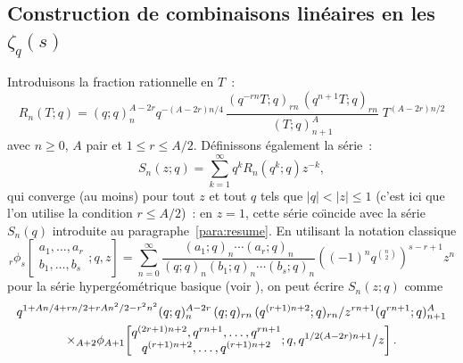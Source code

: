 \documentclass[12pt]{amsart}
\newcommand{\io}{\infty}
\def\poq#1#2{(#1;q)_#2}
\theoremstyle{remark}
\numberwithin{equation}{section}
\begin{document}
\subsection{Construction de combinaisons lin{\'e}aires 
en les $\zeta_q(s)$ }\label{ssec:combE}
Introduisons la fraction rationnelle en $T$~: 
\begin{equation*}
R_n(T;q)
= (q;q)_n^{A-2r}q^{-(A-2r)n/4}\,
\frac{(q^{-rn}T;q)_{rn}\,(q^{n+1}T;q)_{rn}}{(T;q)_{n+1}^{A}}\;T^{(A-2r)n/2}
\end{equation*}
avec $n\ge 0$, $A$ pair et $1\le r\le  A/2$.
D{\'e}finissons {\'e}galement la
s{\'e}rie~:
$$
S_n(z;q)=\sum_{k=1}^{\io}q^k R_n(q^k;q)z^{-k},
$$
qui converge (au moins) pour tout $z$ et tout $q$ tels que 
$\vert q\vert <\vert z\vert \le 1$ 
(c'est ici que l'on utilise la condition $r\le A/2$)~: 
en $z=1$, cette s{\'e}rie co{\"\i}ncide avec 
la s{\'e}rie $S_n(q)$ introduite au paragraphe~\ref{para:resume}. 
En utilisant la notation classique
\begin{equation} \label{eq:hyp}
{}_r\phi_s\!\left[\begin{matrix} a_1,\dots,a_r\\
b_1,\dots,b_s\end{matrix}; q,
z\right]=\sum _{n=0} ^{\infty}\frac {\poq{a_1}{n}\cdots\poq{a_r}{n}}
{\poq{q}{n}\poq{b_1}{n}\cdots\poq{b_s}{n}}\left((-1)^nq^{\binom
n2}\right)^{s-r+1}z^n
\end{equation}
pour la s{\'e}rie hyperg{\'e}om{\'e}trique basique (voir \cite{gr}), on peut {\'e}crire
$S_n(z;q)$ comme
\begin{multline*}
q^{1 + \frac{A n}{4} + \frac{rn }{2} + \frac{rA n^2 }{2} -
r^2 n^2 }
\frac{
({\let \over / \def\frac#1#2{#1 / #2} q}; q) _{n} ^{A - 2 r}\,
({\let \over / \def\frac#1#2{#1 / #2} q}; q) _{r n} \,
({\let \over / \def\frac#1#2{#1 / #2} q^ {(r+1)n+2}}; q)
_{r n}  }{{z^{ rn+1}(\let \over /
\def\frac#1#2{#1 / #2} q^ { rn+1}}; q) _{n+1} ^A}\\
\times
{}_{A+2}\phi_{A+1}\!\left[\begin{matrix} 
q^ { (2r+1)n+2}, q^ { r n+1},\dots,q^ {r n+1}\\
q^ {(r+1)n+2},\dots,q^ {(r+1)n+2}\end{matrix}; q, 
\frac {q^ { \frac{1}{2}(A - 2 r)n+1}} z\right].
\end{multline*}
\end{document}
